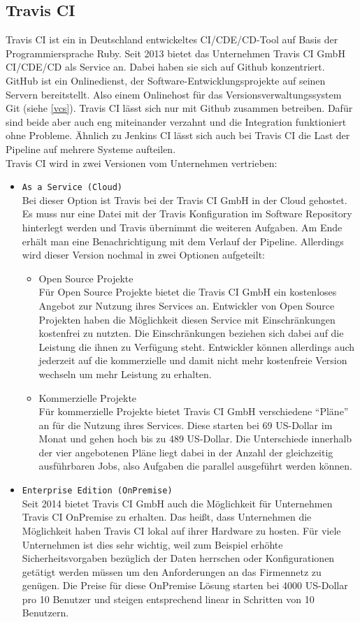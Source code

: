 \subsection{Travis CI}
Travis CI ist ein in Deutschland entwickeltes \ac{CI}/\ac{CDE}/\ac{CD}-Tool auf Basis der Programmiersprache Ruby. Seit 2013 bietet das Unternehmen Travis CI GmbH \ac{CI}/\ac{CDE}/\ac{CD} als Service an. Dabei haben sie sich auf Github konzentriert. GitHub ist ein Onlinedienst, der Software-Entwicklungsprojekte auf seinen Servern bereitstellt. Also einem Onlinehost für das Versionsverwaltungssystem Git (siehe \ref{vcs}). Travis CI lässt sich nur mit Github zusammen betreiben. Dafür sind beide aber auch eng miteinander verzahnt und die Integration funktioniert ohne Probleme. Ähnlich zu Jenkins CI lässt sich auch bei Travis CI die Last der Pipeline auf mehrere Systeme aufteilen.\\
Travis CI wird in zwei Versionen vom Unternehmen vertrieben:
\begin{itemize}
	\item \texttt{As a Service (Cloud)}\\
	Bei dieser Option ist Travis bei der Travis CI GmbH in der Cloud gehostet. Es muss nur eine Datei mit der Travis Konfiguration im Software Repository hinterlegt werden und Travis übernimmt die weiteren Aufgaben. Am Ende erhält man eine Benachrichtigung mit dem Verlauf der Pipeline. Allerdings wird dieser Version nochmal in zwei Optionen aufgeteilt:
	\begin{itemize}
		\item Open Source Projekte\\
		Für Open Source Projekte bietet die Travis CI GmbH ein kostenloses Angebot zur Nutzung ihres Services an. Entwickler von Open Source Projekten haben die Möglichkeit diesen Service mit Einschränkungen kostenfrei zu nutzten. Die Einschränkungen beziehen sich dabei auf die Leistung die ihnen zu Verfügung steht. Entwickler können allerdings auch jederzeit auf die kommerzielle und damit nicht mehr kostenfreie Version wechseln um mehr Leistung zu erhalten.
		\item Kommerzielle Projekte\\
		Für kommerzielle Projekte bietet Travis CI GmbH verschiedene \enquote{Pläne} an für die Nutzung ihres Services. Diese starten bei 69 US-Dollar im Monat und gehen hoch bis zu 489 US-Dollar. Die Unterschiede innerhalb der vier angebotenen Pläne liegt dabei in der Anzahl der gleichzeitig ausführbaren Jobs, also Aufgaben die parallel ausgeführt werden können.
	\end{itemize}
	\item \texttt{Enterprise Edition (OnPremise)}\\
	Seit 2014 bietet Travis CI GmbH auch die Möglichkeit für Unternehmen Travis CI OnPremise zu erhalten. Das heißt, dass Unternehmen die Möglichkeit haben Travis CI lokal auf ihrer Hardware zu hosten. Für viele Unternehmen ist dies sehr wichtig, weil zum Beispiel erhöhte Sicherheitsvorgaben bezüglich der Daten herrschen oder Konfigurationen getätigt werden müssen um den Anforderungen an das Firmennetz zu genügen. Die Preise für diese OnPremise Lösung starten bei 4000 US-Dollar pro 10 Benutzer und steigen entsprechend linear in Schritten von 10 Benutzern.
\end{itemize}
